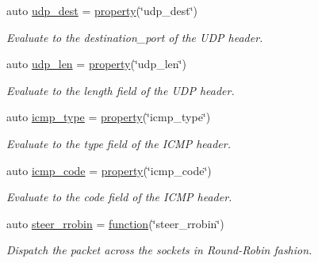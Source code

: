 \begin{DoxyCompactItemize}
auto \hyperlink{namespacepfq_1_1lang_1_1anonymous__namespace_02default_8hpp_03_a7c15d9ec0af24b9515acc8a04b7b1e2e}{udp\+\_\+dest} = \hyperlink{namespacepfq_1_1lang_a1249450e72229273b0db707a286aea91}{property}(\char`\"{}udp\+\_\+dest\char`\"{})
\begin{DoxyCompactList}\small\item\em Evaluate to the {\ttfamily destination\+\_\+port} of the U\+DP header. \end{DoxyCompactList}\item 
auto \hyperlink{namespacepfq_1_1lang_1_1anonymous__namespace_02default_8hpp_03_ac7f1ef80a8ec46ce01aa12f66cfee86b}{udp\+\_\+len} = \hyperlink{namespacepfq_1_1lang_a1249450e72229273b0db707a286aea91}{property}(\char`\"{}udp\+\_\+len\char`\"{})
\begin{DoxyCompactList}\small\item\em Evaluate to the {\ttfamily length} field of the U\+DP header. \end{DoxyCompactList}\item 
auto \hyperlink{namespacepfq_1_1lang_1_1anonymous__namespace_02default_8hpp_03_a0c15abbec8753be8bb160633f697ed4b}{icmp\+\_\+type} = \hyperlink{namespacepfq_1_1lang_a1249450e72229273b0db707a286aea91}{property}(\char`\"{}icmp\+\_\+type\char`\"{})
\begin{DoxyCompactList}\small\item\em Evaluate to the {\ttfamily type} field of the I\+C\+MP header. \end{DoxyCompactList}\item 
auto \hyperlink{namespacepfq_1_1lang_1_1anonymous__namespace_02default_8hpp_03_a026262dd85de1db88a8303ed0f3dac18}{icmp\+\_\+code} = \hyperlink{namespacepfq_1_1lang_a1249450e72229273b0db707a286aea91}{property}(\char`\"{}icmp\+\_\+code\char`\"{})
\begin{DoxyCompactList}\small\item\em Evaluate to the {\ttfamily code} field of the I\+C\+MP header. \end{DoxyCompactList}\item 
auto \hyperlink{namespacepfq_1_1lang_1_1anonymous__namespace_02default_8hpp_03_a98f503710ebfe66f6866d642af30b1a8}{steer\+\_\+rrobin} = \hyperlink{namespacepfq_1_1lang_a1a4638059d700ae08d0ca63886ff2bb3}{function}(\char`\"{}steer\+\_\+rrobin\char`\"{})
\begin{DoxyCompactList}\small\item\em Dispatch the packet across the sockets in Round-\/\+Robin fashion. \end{DoxyCompactList}\item 

\end{DoxyCompactItemize}
